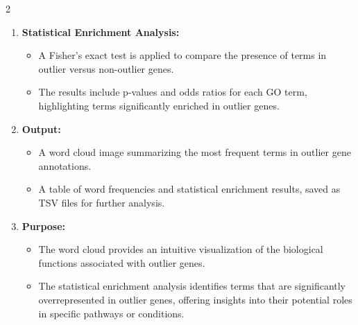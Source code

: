 2\documentclass{article}
\begin{document}
\begin{enumerate}
    \item \textbf{Statistical Enrichment Analysis:}
    \begin{itemize}
        \item A Fisher's exact test is applied to compare the presence of terms in outlier versus non-outlier genes.
        \item The results include p-values and odds ratios for each GO term, highlighting terms significantly enriched in outlier genes.
    \end{itemize}

    \item \textbf{Output:}
    \begin{itemize}
        \item A word cloud image summarizing the most frequent terms in outlier gene annotations.
        \item A table of word frequencies and statistical enrichment results, saved as TSV files for further analysis.
    \end{itemize}

    \item \textbf{Purpose:}
    \begin{itemize}
        \item The word cloud provides an intuitive visualization of the biological functions associated with outlier genes.
        \item The statistical enrichment analysis identifies terms that are significantly overrepresented in outlier genes, offering insights into their potential roles in specific pathways or conditions.
    \end{itemize}
\end{enumerate}
\end{document}
